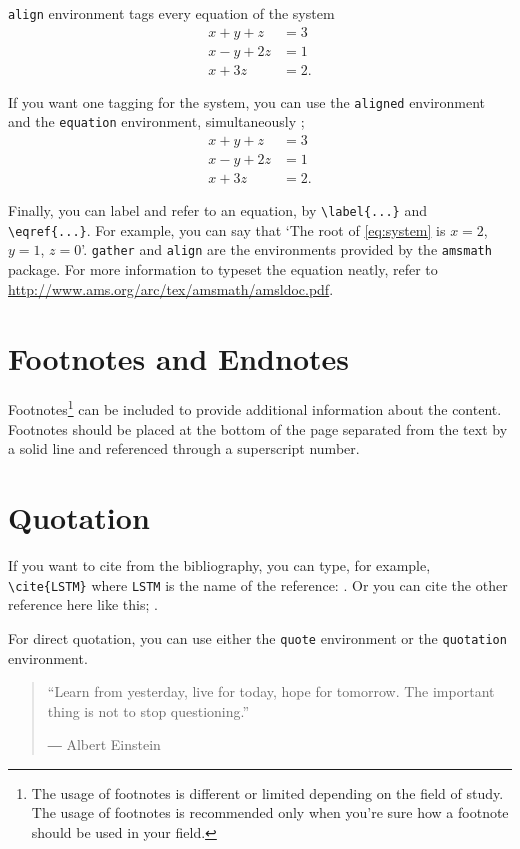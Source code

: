 \texttt{align} environment tags every equation of the system
\begin{align}
x+y+z&=3\\
x-y+2z&=1\\
x+3z&=2.
\end{align}

If you want one tagging for the system, you can use the \texttt{aligned} environment and the \texttt{equation} environment, simultaneously ;
\begin{equation}\label{eq:system}
\begin{aligned}
x+y+z&=3\\
x-y+2z&=1\\
x+3z&=2.
\end{aligned}
\end{equation}

Finally, you can label and refer to an equation, by \verb|\label{...}| and \verb|\eqref{...}|.
For example, you can say that `The root of \eqref{eq:system} is \(x=2\), \(y=1\), \(z=0\)'.
\texttt{gather} and \texttt{align} are the environments provided by the \texttt{amsmath} package.
For more information to typeset the equation neatly, refer to \url{http://www.ams.org/arc/tex/amsmath/amsldoc.pdf}.


\section{Footnotes and Endnotes}\label{sec:footnotes_endnotes}

Footnotes\footnote{The usage of footnotes is different or limited depending on the field of study. The usage of footnotes is recommended only when you’re sure how a footnote should be used in your field.} can be included to provide additional information about the content. Footnotes should be placed at the bottom of the page separated from the text by a solid line and referenced through a superscript number.



\section{Quotation}
If you want to cite from the bibliography, you can type, for example, \verb|\cite{LSTM}| where \texttt{LSTM} is the name of the reference: \cite{LSTM}.
Or you can cite the other reference here like this; \cite{pure}.

For direct quotation, you can use either the \texttt{quote} environment or the \texttt{quotation} environment.
\begin{quote}
“Learn from yesterday, live for today, hope for tomorrow. The important thing is not to stop questioning.” \par
― Albert Einstein 
\end{quote}

